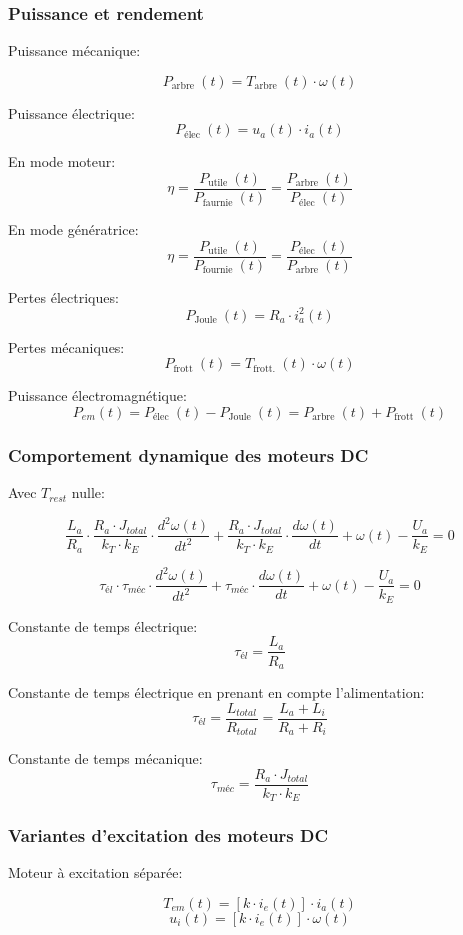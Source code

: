 \documentclass[10pt]{article} %
\begin{document}
\begin{multicols}{3}
			\subsubsection*{Puissance et rendement}
				
				Puissance mécanique:
				
				\[P_{\text {arbre }}(t)=T_{\text {arbre }}(t) \cdot \omega(t)\]
				
				Puissance électrique:
				\[P_{\text {élec }}(t)=u_{a}(t) \cdot i_{a}(t)\]
				
				En mode moteur:
				\[\eta=\frac{P_{\text {utile }}(t)}{P_{\text {faurnie }}(t)}=\frac{P_{\text {arbre }}(t)}{P_{\text {élec }}(t)}\]
				
				En mode génératrice:
				\[\eta=\frac{P_{\text {utile }}(t)}{P_{\text {fournie }}(t)}=\frac{P_{\text {élec }}(t)}{P_{\text {arbre }}(t)}\]
				
				Pertes électriques:
				\[P_{\text {Joule }}(t)=R_{a} \cdot i_{a}^{2}(t)\]
				
				Pertes mécaniques:
				\[P_{\text {frott }}(t)=T_{\text {frott. }}(t) \cdot \omega(t)\]
				
				Puissance électromagnétique:
				\[P_{e m}(t)=P_{\text {élec }}(t)-P_{\text {Joule }}(t)=P_{\text {arbre }}(t)+P_{\text {frott }}(t)\]
			
			
			
			
			\subsubsection*{Comportement dynamique des moteurs DC}
			
				Avec $T_{rest}$ nulle:
				
				\[\frac{L_{a}}{R_{a}} \cdot \frac{R_{a} \cdot J_{t o t a l}}{k_{T} \cdot k_{E}} \cdot \frac{d^{2} \omega(t)}{d t^{2}}+\frac{R_{a} \cdot J_{t o t a l}}{k_{T} \cdot k_{E}} \cdot \frac{d \omega(t)}{d t}+\omega(t)-\frac{U_{a}}{k_{E}}=0\]
				
				\[\tau_{é l} \cdot \tau_{m é c} \cdot \frac{d^{2} \omega(t)}{d t^{2}}+\tau_{m é c} \cdot \frac{d \omega(t)}{d t}+\omega(t)-\frac{U_{a}}{k_{E}}=0\]
				
				Constante de temps électrique:
				\[\tau_{é l}=\frac{L_{a}}{R_{a}}\]
				
				Constante de temps électrique en prenant en compte l'alimentation:
				\[\tau_{é l}=\frac{L_{t o t a l}}{R_{t o t a l}}=\frac{L_{a}+L_{i}}{R_{a}+R_{i}}\]
				
				Constante de temps mécanique:
				\[\tau_{m é c}=\frac{R_{a} \cdot J_{t o t a l}}{k_{T} \cdot k_{E}}\]
				
			\subsubsection*{Variantes d'excitation des moteurs DC}
				
				Moteur à excitation séparée:
				
				\[T_{e m}(t)=\left[k \cdot i_{e}(t)\right] \cdot i_{a}(t)\]
				\[u_{i}(t)=\left[k \cdot i_{e}(t)\right] \cdot \omega(t)\]
	\end{multicols}
\end{document}
